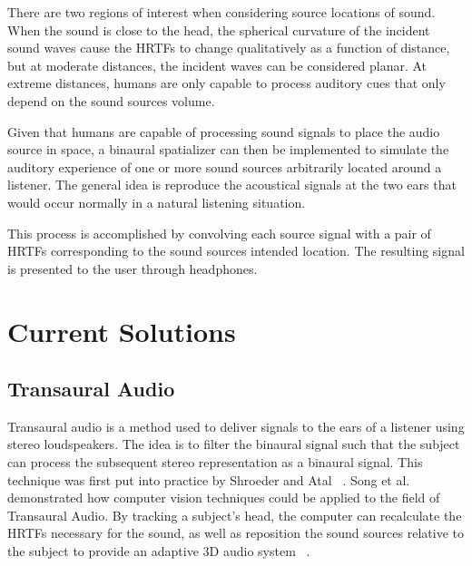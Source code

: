 There are two regions of interest when considering source locations of sound.
When the sound is close to the head, the spherical curvature of the incident
sound waves cause the HRTFs to change qualitatively as a function of distance,
but at moderate distances, the incident waves can be considered planar. At
extreme distances, humans are only capable to process auditory cues that only
depend on the sound sources volume.

Given that humans are capable of processing sound signals to place the audio
source in space, a binaural spatializer can then be implemented to simulate the
auditory experience of one or more sound sources arbitrarily located around a
listener.  The general idea is reproduce the acoustical signals at the two ears
that would occur normally in a natural listening situation.

This process is accomplished by convolving each source signal with a pair of
HRTFs corresponding to the sound sources intended location.  The resulting
signal is presented to the user through headphones.



\section{                  Current Solutions                                  }

\subsection{                  Transaural Audio                                }

Transaural audio is a method used to deliver signals to the ears of a listener
using stereo loudspeakers. The idea is to filter the binaural signal such that
the subject can process the subsequent stereo representation as a binaural
signal.  This technique was first put into practice by Shroeder and Atal
~\cite{ schroeder1963computer, schroeder1970digital }. Song et al. demonstrated
how computer vision techniques could be applied to the field of Transaural
Audio. By tracking a subject's head, the computer can recalculate the HRTFs
necessary for the sound, as well as reposition the sound sources relative to the
subject to provide an adaptive 3D audio system ~\cite{song2010personal}.



